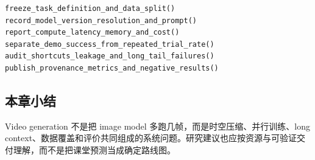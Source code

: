 \begin{lstlisting}[caption={多模态研究项目的发布前检查}]
freeze_task_definition_and_data_split()
record_model_version_resolution_and_prompt()
report_compute_latency_memory_and_cost()
separate_demo_success_from_repeated_trial_rate()
audit_shortcuts_leakage_and_long_tail_failures()
publish_provenance_metrics_and_negative_results()
\end{lstlisting}


\subsection{本章小结}

Video generation 不是把 image model 多跑几帧，而是时空压缩、并行训练、long context、数据覆盖和评价共同组成的系统问题。研究建议也应按资源与可验证交付理解，而不是把课堂预测当成确定路线图。

